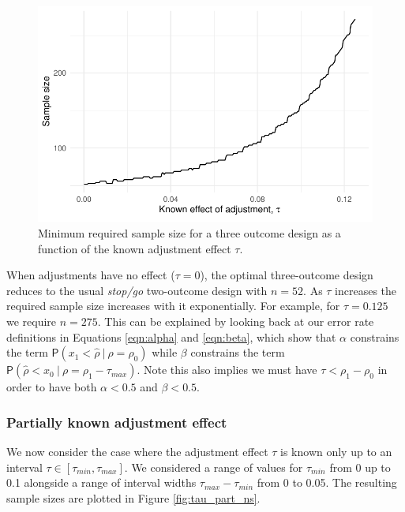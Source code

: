 \documentclass{bmcart}
\newcommand{\PR}{{\mathsf P}}
\begin{document}
\begin{figure}
\centering
\includegraphics[scale=0.8]{./figures/tau_ns}
\caption{Minimum required sample size for a three outcome design as a function of the known adjustment effect $\tau$.}
\label{fig:tau_ns}
\end{figure}

When adjustments have no effect ($\tau = 0$), the optimal three-outcome design reduces to the usual \emph{stop/go} two-outcome design with $n = 52$. As $\tau$ increases the required sample size increases with it exponentially. For example, for $\tau = 0.125$ we require $n = 275$. This can be explained by looking back at our error rate definitions in Equations \ref{eqn:alpha} and \ref{eqn:beta}, which show that $\alpha$ constrains the term $\PR(x_1 < \hat{\rho} ~|~ \rho = \rho_0)$ while $\beta$ constrains the term $\PR(\hat{\rho} < x_0 ~|~ \rho = \rho_1 - \tau_{max})$. Note this also implies we must have $\tau < \rho_1 - \rho_0$ in order to have both $\alpha < 0.5$ and $\beta < 0.5$.

\subsubsection{Partially known adjustment effect}

We now consider the case where the adjustment effect $\tau$ is known only up to an interval $\tau \in [\tau_{min}, \tau_{max}]$. We considered a range of values for $\tau_{min}$ from 0 up to 0.1 alongside a range of interval widths $\tau_{max} - \tau_{min}$ from 0 to 0.05. The resulting sample sizes are plotted in Figure \ref{fig:tau_part_ns}.
\end{document}
